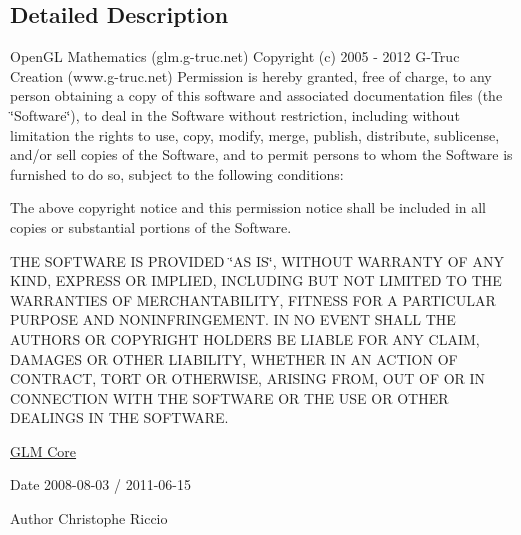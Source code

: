 \subsection{Detailed Description}
Open\-G\-L Mathematics (glm.\-g-\/truc.\-net) Copyright (c) 2005 -\/ 2012 G-\/\-Truc Creation (www.\-g-\/truc.\-net) Permission is hereby granted, free of charge, to any person obtaining a copy of this software and associated documentation files (the \char`\"{}\-Software\char`\"{}), to deal in the Software without restriction, including without limitation the rights to use, copy, modify, merge, publish, distribute, sublicense, and/or sell copies of the Software, and to permit persons to whom the Software is furnished to do so, subject to the following conditions\-:

The above copyright notice and this permission notice shall be included in all copies or substantial portions of the Software.

T\-H\-E S\-O\-F\-T\-W\-A\-R\-E I\-S P\-R\-O\-V\-I\-D\-E\-D \char`\"{}\-A\-S I\-S\char`\"{}, W\-I\-T\-H\-O\-U\-T W\-A\-R\-R\-A\-N\-T\-Y O\-F A\-N\-Y K\-I\-N\-D, E\-X\-P\-R\-E\-S\-S O\-R I\-M\-P\-L\-I\-E\-D, I\-N\-C\-L\-U\-D\-I\-N\-G B\-U\-T N\-O\-T L\-I\-M\-I\-T\-E\-D T\-O T\-H\-E W\-A\-R\-R\-A\-N\-T\-I\-E\-S O\-F M\-E\-R\-C\-H\-A\-N\-T\-A\-B\-I\-L\-I\-T\-Y, F\-I\-T\-N\-E\-S\-S F\-O\-R A P\-A\-R\-T\-I\-C\-U\-L\-A\-R P\-U\-R\-P\-O\-S\-E A\-N\-D N\-O\-N\-I\-N\-F\-R\-I\-N\-G\-E\-M\-E\-N\-T. I\-N N\-O E\-V\-E\-N\-T S\-H\-A\-L\-L T\-H\-E A\-U\-T\-H\-O\-R\-S O\-R C\-O\-P\-Y\-R\-I\-G\-H\-T H\-O\-L\-D\-E\-R\-S B\-E L\-I\-A\-B\-L\-E F\-O\-R A\-N\-Y C\-L\-A\-I\-M, D\-A\-M\-A\-G\-E\-S O\-R O\-T\-H\-E\-R L\-I\-A\-B\-I\-L\-I\-T\-Y, W\-H\-E\-T\-H\-E\-R I\-N A\-N A\-C\-T\-I\-O\-N O\-F C\-O\-N\-T\-R\-A\-C\-T, T\-O\-R\-T O\-R O\-T\-H\-E\-R\-W\-I\-S\-E, A\-R\-I\-S\-I\-N\-G F\-R\-O\-M, O\-U\-T O\-F O\-R I\-N C\-O\-N\-N\-E\-C\-T\-I\-O\-N W\-I\-T\-H T\-H\-E S\-O\-F\-T\-W\-A\-R\-E O\-R T\-H\-E U\-S\-E O\-R O\-T\-H\-E\-R D\-E\-A\-L\-I\-N\-G\-S I\-N T\-H\-E S\-O\-F\-T\-W\-A\-R\-E.

\hyperlink{group__core}{G\-L\-M Core}

\begin{DoxyDate}{Date}
2008-\/08-\/03 / 2011-\/06-\/15 
\end{DoxyDate}
\begin{DoxyAuthor}{Author}
Christophe Riccio 
\end{DoxyAuthor}
